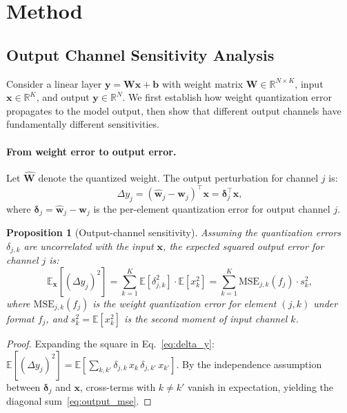 \documentclass{article}
\newtheorem{proposition}{Proposition}
\begin{document}
\section{Method}
\label{sec:method}

\subsection{Output Channel Sensitivity Analysis}
\label{sec:sensitivity}

Consider a linear layer $\mathbf{y} = \mathbf{W}\mathbf{x} + \mathbf{b}$ with weight matrix $\mathbf{W} \in \mathbb{R}^{N \times K}$, input $\mathbf{x} \in \mathbb{R}^K$, and output $\mathbf{y} \in \mathbb{R}^N$.
We first establish how weight quantization error propagates to the model output, then show that different output channels have fundamentally different sensitivities.

\paragraph{From weight error to output error.}
Let $\hat{\mathbf{W}}$ denote the quantized weight.
The output perturbation for channel $j$ is:
\begin{equation}
\label{eq:delta_y}
\Delta y_j = (\hat{\mathbf{w}}_j - \mathbf{w}_j)^\top \mathbf{x} = \boldsymbol{\delta}_j^\top \mathbf{x},
\end{equation}
where $\boldsymbol{\delta}_j = \hat{\mathbf{w}}_j - \mathbf{w}_j$ is the per-element quantization error for output channel $j$.

\begin{proposition}[Output-channel sensitivity]
\label{prop:sensitivity}
Assuming the quantization errors $\delta_{j,k}$ are uncorrelated with the input $\mathbf{x}$, the expected squared output error for channel $j$ is:
\begin{equation}
\label{eq:output_mse}
\mathbb{E}_{\mathbf{x}}\!\left[(\Delta y_j)^2\right] = \sum_{k=1}^K \mathbb{E}[\delta_{j,k}^2] \cdot \mathbb{E}[x_k^2] = \sum_{k=1}^K \text{MSE}_{j,k}(f_j) \cdot s_k^2,
\end{equation}
where $\text{MSE}_{j,k}(f_j)$ is the weight quantization error for element $(j,k)$ under format $f_j$, and $s_k^2 = \mathbb{E}[x_k^2]$ is the second moment of input channel $k$.
\end{proposition}

\begin{proof}
Expanding the square in Eq.~\eqref{eq:delta_y}:
$\mathbb{E}[(\Delta y_j)^2] = \mathbb{E}\!\left[\sum_{k,k'} \delta_{j,k}\, x_k\, \delta_{j,k'}\, x_{k'}\right]$.
By the independence assumption between $\boldsymbol{\delta}_j$ and $\mathbf{x}$, cross-terms with $k \neq k'$ vanish in expectation, yielding the diagonal sum~\eqref{eq:output_mse}.
\end{proof}
\end{document}
